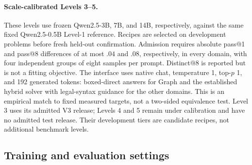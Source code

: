 \documentclass{article}
\newcommand{\1}{\mathbf 1}
\theoremstyle{remark}
\theoremstyle{definition}
\theoremstyle{plain}
\begin{document}
\paragraph{Scale-calibrated Levels 3--5.}
These levels use frozen Qwen2.5-3B, 7B, and 14B, respectively, against the
same fixed Qwen2.5-0.5B Level-1 reference. Recipes are selected on development
problems before fresh held-out confirmation. Admission requires absolute
pass@1 and pass@8 differences of at most $.04$ and $.08$, respectively,
in every domain, with four independent groups of eight samples per prompt.
Distinct@8 is reported but is not a fitting objective. The interface uses
native chat, temperature 1, top-$p$ 1, and 192 generated tokens: boxed-direct
answers for Graph and the established hybrid solver with legal-syntax
guidance for the other domains. This is an empirical match to fixed measured
targets, not a two-sided equivalence test. Level 3 uses its admitted V3 release;
Levels 4 and 5 remain under calibration and have no admitted test release.
Their development tiers are candidate recipes, not additional benchmark levels.

\subsection{Training and evaluation settings}
\label{app:repro-run-contract}
\label{app:comparison-design}
\end{document}
